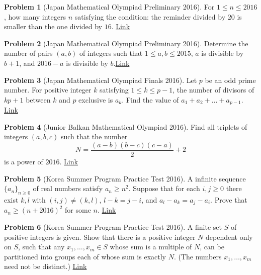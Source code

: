 \documentclass[]{article}
\theoremstyle{definition}
\newtheorem{problem}{Problem}
\begin{document}
\begin{problem}[Japan Mathematical Olympiad Preliminary 2016]
	For $1\leq n\leq 2016$, how many integers $n$ satisfying the condition: the reminder divided by $20$ is smaller than the one divided by $16$. \hfill \href{http://artofproblemsolving.com/community/c6h1195499p5852489}{Link}
\end{problem}





\begin{problem}[Japan Mathematical Olympiad Preliminary 2016]
	Determine the number of pairs $(a, b)$ of integers such that $1 \leq a, b \leq 2015$, $a$ is divisible by $b + 1$, and $2016 - a$ is divisible by $b$.\href{http://artofproblemsolving.com/community/c6h1195508p5852517}{Link}
\end{problem}




\begin{problem}[Japan Mathematical Olympiad Finals 2016]
	Let $p$ be an odd prime number. For positive integer $k$ satisfying $1\le k\le p-1$, the number of divisors of $kp+1$ between $k$ and $p$ exclusive is $a_k$. Find the value of $a_1+a_2+\ldots + a_{p-1}$. \hfill \href{http://artofproblemsolving.com/community/c6h1225510p6158692}{Link}
\end{problem}




\begin{problem}[Junior Balkan Mathematical Olympiad 2016]
	Find all triplets of integers $(a,b,c)$ such that the number
	$$N = \frac{(a-b)(b-c)(c-a)}{2} + 2$$is a power of $2016$. \hfill \href{http://artofproblemsolving.com/community/c6h1263182p6565545}{Link}
\end{problem}






\begin{problem}[Korea Summer Program Practice Test 2016]
	A infinite sequence $\{ a_n \}_{n \ge 0}$ of real numbers satisfy $a_n \ge n^2$. Suppose that for each $i, j \ge 0$ there exist $k, l$ with $(i,j) \neq (k,l)$, $l - k = j - i$, and $a_l - a_k = a_j - a_i$. Prove that $a_n \ge (n + 2016)^2$ for some $n$. \hfill \href{http://artofproblemsolving.com/community/c6h1291457p6833569}{Link}
\end{problem}



\begin{problem}[Korea Summer Program Practice Test 2016]
	A finite set $S$ of positive integers is given. Show that there is a positive integer $N$ dependent only on $S$, such that any $x_1, \dots, x_m \in S$ whose sum is a multiple of $N$, can be partitioned into groups each of whose sum is exactly $N$. (The numbers $x_1, \dots, x_m$ need not be distinct.) \hfill \href{http://artofproblemsolving.com/community/c6h1291452p6833555}{Link}
\end{problem}
\end{document}
